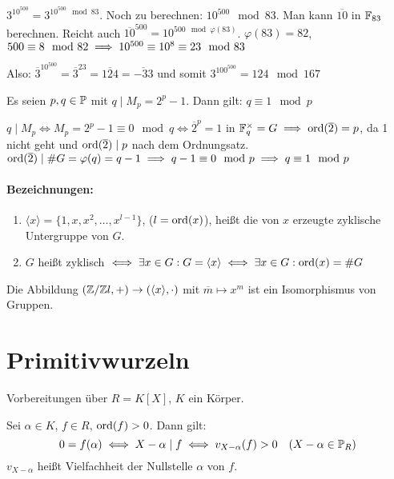 \documentclass[a4paper,twoside,DIV15,BCOR12mm]{scrbook}
\begin{document}
$3^{10^{500}} = 3^{10^{500} \mod 83}$. Noch zu berechnen: $10^{500}
\mod 83$. Man kann $\overline{10}$ in $\mathbb{F}_{83}$ berechnen. Reicht
auch $\overline{10}^{500} = 10^{500\mod \varphi(83)}$. $\varphi(83)
= 82$, $500\equiv 8 \mod 82 \implies 10^{500} \equiv 10^8 \equiv 23
\mod 83$

Also: $\overline 3 ^{10 ^{500}} = \overline 3 ^{23} =
\overline{124}= \overline{-33}$ und somit $3^{100^{500}} = 124 \mod
167$

\begin{satz}
Es seien $p,q\in\mathbb{P}$ mit $q \mid M_p = 2^p-1$. Dann gilt: $q\equiv
1 \mod p$
\end{satz}

\begin{beweis}
$q\mid M_p \iff M_p = 2^p-1 \equiv 0 \mod q \iff \overline 2^p = 1$
in $\mathbb{F}_q^\times=G \implies \mathop{\rm ord}\nolimits(\overline 2) = p$, da 1 nicht geht
und $\mathop{\rm ord}\nolimits(\overline 2)\mid p$ nach dem Ordnungsatz. $\mathop{\rm ord}\nolimits(\overline
2) \mid \# G = \varphi(q) = q-1 \implies q-1 \equiv 0 \mod p \implies q
\equiv 1 \mod p$
\end{beweis}


\paragraph{Bezeichnungen:}
\begin{enumerate}
\item $\langle x \rangle  = \{1,x,x^2,\ldots,x^{l-1}\}$, ($l=\mathop{\rm ord}\nolimits(x)$), heißt die von $x$ erzeugte zyklische Untergruppe von $G$.
\item $G$ heißt zyklisch $\iff \exists x \in G: G=\langle x\rangle  \iff \exists x \in G: \mathop{\rm ord}\nolimits(x)=\#G$
\end{enumerate}

\begin{bemerkung}
Die Abbildung $(\mathbb{Z}/\mathbb{Z} l,+)\to (\langle x\rangle ,\cdot)$ mit
$\overline m \mapsto x^m$ ist ein Isomorphismus von Gruppen.
\end{bemerkung}
\section{Primitivwurzeln}

Vorbereitungen über $R=K[X]$, $K$ ein Körper.

\begin{bemerkung}
Sei $\alpha \in K$, $f\in R$, $\mathop{\rm ord}\nolimits(f)>0$. Dann gilt:
\[ 0 = f(\alpha) \iff X-\alpha \mid f \iff v_{X-\alpha}(f) > 0 \quad ( X-\alpha \in \mathbb{P}_{R} )\]
$v_{X-\alpha}$ heißt Vielfachheit der Nullstelle $\alpha$ von $f$.
\end{bemerkung}
\end{document}
